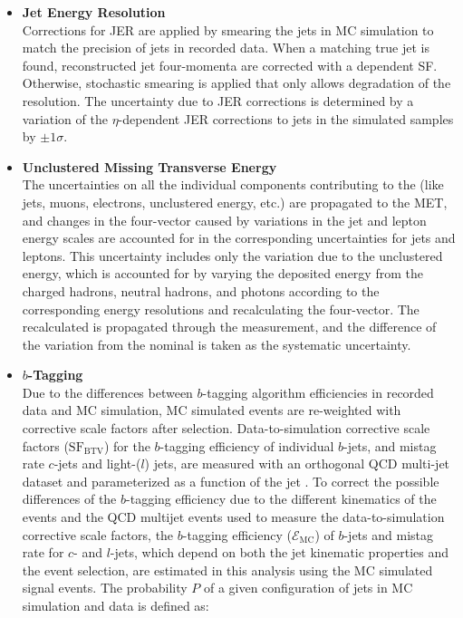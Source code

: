 \begin{itemize}
    \item {\bf Jet Energy Resolution} \\
    Corrections for JER are applied by smearing the jets in MC simulation to match the precision of jets in recorded data.
    When a matching true jet is found, reconstructed jet four-momenta are corrected with a \pT dependent SF.
    Otherwise, stochastic smearing is applied that only allows degradation of the resolution.
    The uncertainty due to JER corrections is determined by a variation of the $\eta$-dependent JER corrections to jets in the simulated samples by $\pm 1\sigma$.
    \item {\bf Unclustered Missing Transverse Energy} \\
    The uncertainties on all the individual components contributing to the \ETmiss (like jets, muons, electrons, unclustered energy, etc.) are propagated to the MET, and changes in the \ETmiss four-vector caused by variations in the jet and lepton energy scales are accounted for in the corresponding uncertainties for jets and leptons.
    This uncertainty includes only the variation due to the unclustered energy, which is accounted for by varying the deposited energy from the charged hadrons, neutral hadrons, and photons according to the corresponding energy resolutions and recalculating the \ETmiss four-vector. 
    The recalculated \ETmiss is propagated through the measurement, and the difference of the variation from the nominal is taken as the systematic uncertainty.
    \item {\bf $b$-Tagging} \\
    Due to the differences between $b$-tagging algorithm efficiencies in recorded data and MC simulation, MC simulated events are re-weighted with corrective scale factors after selection.
    Data-to-simulation corrective scale factors ($\text{SF}_{\text{BTV}}$) for the $b$-tagging efficiency of individual $b$-jets, and mistag rate $c$-jets and light-($l$) jets, are measured with an orthogonal QCD multi-jet dataset and parameterized as a function of the jet \pT.
    To correct the possible differences of the $b$-tagging efficiency due to the different kinematics of the \ttbar events and the QCD multijet events used to measure the data-to-simulation corrective scale factors, the $b$-tagging efficiency ($\mathcal{E}_{\text{MC}}$) of $b$-jets and mistag rate for $c$- and $l$-jets, which depend on both the jet kinematic properties and the event selection, are estimated in this analysis using the MC simulated \ttbar signal events.
    The probability $P$ of a given configuration of jets in MC simulation and data is defined as:

\end{itemize}
